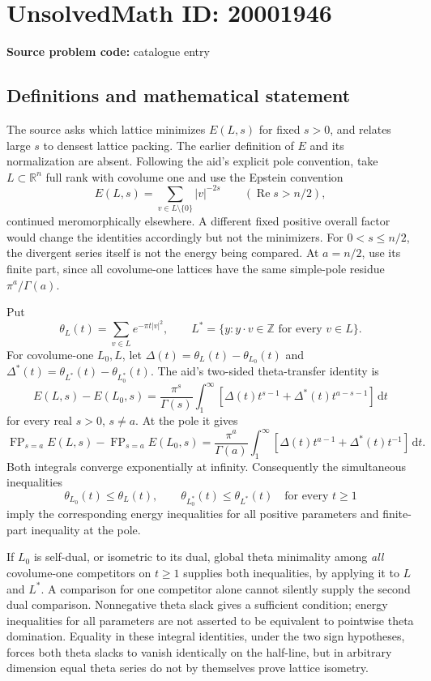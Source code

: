 \documentclass[11pt]{article}
\newcommand{\Z}{\mathbb{Z}}
\newcommand{\R}{\mathbb{R}}
\newcommand{\dd}{\,\mathrm{d}}
\begin{document}
\section*{UnsolvedMath ID: 20001946}
\textbf{Source problem code:} catalogue entry
\subsection{Definitions and mathematical statement}
The source asks which lattice minimizes \(E(L,s)\) for fixed \(s>0\), and relates large \(s\) to densest lattice packing. The earlier definition of \(E\) and its normalization are absent. Following the aid's explicit pole convention, take \(L\subset\R^n\) full rank with covolume one and use the Epstein convention
\[
 E(L,s)=\sum_{v\in L\setminus\{0\}}|v|^{-2s}
 \qquad(\operatorname{Re}s>n/2),
\]
continued meromorphically elsewhere. A different fixed positive overall factor would change the identities accordingly but not the minimizers. For \(0<s\leq n/2\), the divergent series itself is not the energy being compared. At \(a=n/2\), use its finite part, since all covolume-one lattices have the same simple-pole residue \(\pi^a/\Gamma(a)\).

Put
\[
 \theta_L(t)=\sum_{v\in L}e^{-\pi t|v|^2},\qquad
 L^*=\{y:y\cdot v\in\Z\text{ for every }v\in L\}.
\]
For covolume-one \(L_0,L\), let
\(\Delta(t)=\theta_L(t)-\theta_{L_0}(t)\) and
\(\Delta^*(t)=\theta_{L^*}(t)-\theta_{L_0^*}(t)\).
The aid's two-sided theta-transfer identity is
\[
 E(L,s)-E(L_0,s)=\frac{\pi^s}{\Gamma(s)}
 \int_1^\infty\left[
 \Delta(t)t^{s-1}+\Delta^*(t)t^{a-s-1}\right]\dd t
\]
for every real \(s>0\), \(s\ne a\). At the pole it gives
\[
 \operatorname{FP}_{s=a}E(L,s)-\operatorname{FP}_{s=a}E(L_0,s)
 =\frac{\pi^a}{\Gamma(a)}\int_1^\infty
 \left[\Delta(t)t^{a-1}+\Delta^*(t)t^{-1}\right]\dd t.
\]
Both integrals converge exponentially at infinity. Consequently the simultaneous inequalities
\[
 \theta_{L_0}(t)\leq\theta_L(t),\qquad
 \theta_{L_0^*}(t)\leq\theta_{L^*}(t)
 \quad\text{for every }t\geq1
\]
imply the corresponding energy inequalities for all positive parameters and finite-part inequality at the pole.

If \(L_0\) is self-dual, or isometric to its dual, global theta minimality among \emph{all} covolume-one competitors on \(t\geq1\) supplies both inequalities, by applying it to \(L\) and \(L^*\). A comparison for one competitor alone cannot silently supply the second dual comparison. Nonnegative theta slack gives a sufficient condition; energy inequalities for all parameters are not asserted to be equivalent to pointwise theta domination. Equality in these integral identities, under the two sign hypotheses, forces both theta slacks to vanish identically on the half-line, but in arbitrary dimension equal theta series do not by themselves prove lattice isometry.
\end{document}
